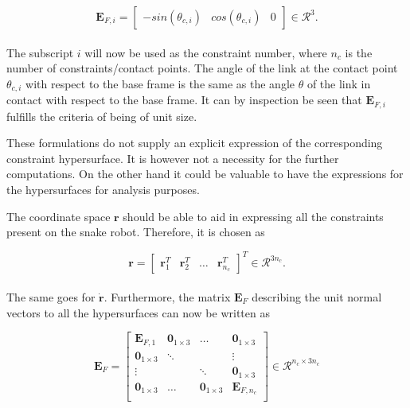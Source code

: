 \begin{equation}
    \mathbf{E}_{F,i} =
    \begin{bmatrix}
        -sin(\theta_{c,i}) & cos(\theta_{c,i}) & 0
    \end{bmatrix} \in \mathcal{R}^3.
\end{equation}
\\
The subscript $i$ will now be used as the constraint number, where $n_c$ is the number of constraints/contact points.
The angle of the link at the contact point $\theta_{c,i}$ with respect to the base frame is the same as the angle $\theta$ of the link in contact with respect to the base frame. It can by inspection be seen that $\mathbf{E}_{F,i}$ fulfills the criteria of being of unit size.

These formulations do not supply an explicit expression of the corresponding constraint hypersurface. It is however not a necessity for the further computations. On the other hand it could be valuable to have the expressions for the hypersurfaces for analysis purposes.

The coordinate space $\mathbf{r}$ should be able to aid in expressing all the constraints present on the snake robot. Therefore, it is chosen as 

\begin{equation}
    \mathbf{r} = 
    \begin{bmatrix}
        \mathbf{r}_1^T & \mathbf{r}_2^T & \dots &\mathbf{r}_{n_c}^T
    \end{bmatrix}^T \in \mathcal{R}^{3 n_c}.
\end{equation}
\\
The same goes for $\dot{\mathbf{r}}$. Furthermore, the matrix $\mathbf{E}_{F}$ describing the unit normal vectors to all the hypersurfaces can now be written as

\begin{equation}
    \mathbf{E}_F = 
    \begin{bmatrix}
        \mathbf{E}_{F,1} & \mathbf{0}_{1\times3} & \dots & \mathbf{0}_{1\times3} \\
        \mathbf{0}_{1\times3} & \ddots & & \vdots \\
        \vdots & & \ddots & \mathbf{0}_{1\times3} \\
        \mathbf{0}_{1\times3} & \dots & \mathbf{0}_{1\times3} & \mathbf{E}_{F,n_c} \\
    \end{bmatrix} \in \mathcal{R}^{n_c \times 3 n_c}
\end{equation}
\\

